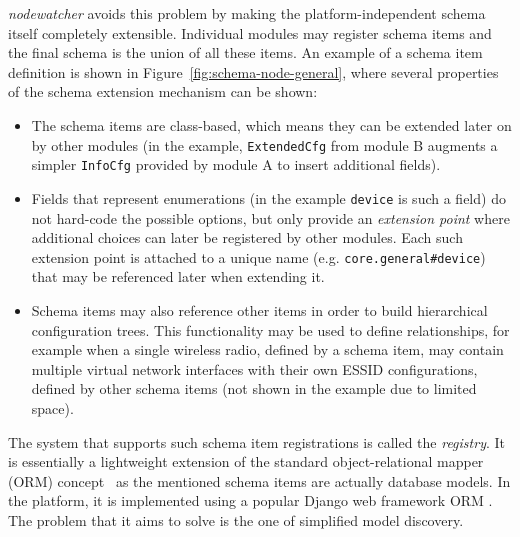 \documentclass[5p,sort&compress]{elsarticle}
\newcommand{\nodewatcher}{\textit{nodewatcher}}
\begin{document}
\nodewatcher{} avoids this problem by making the platform-independent schema itself completely extensible.
Individual modules may register schema items and the final schema is the union of all these items.
An example of a schema item definition is shown in Figure~\ref{fig:schema-node-general}, where several properties of the schema extension mechanism can be shown:
\begin{itemize}
    \item The schema items are class-based, which means they can be extended later on by other modules (in the example, \texttt{ExtendedCfg} from module B augments a simpler \texttt{InfoCfg} provided by module A to insert additional fields).
    \item Fields that represent enumerations (in the example \texttt{device} is such a field) do not hard-code the possible options, but only provide an \textit{extension point} where additional choices can later be registered by other modules.
    Each such extension point is attached to a unique name (e.g. \texttt{core.general\#device}) that may be referenced later when extending it.
    \item Schema items may also reference other items in order to build hierarchical configuration trees. This functionality may be used to define relationships, for example when a single wireless radio, defined by a schema item, may contain multiple virtual network interfaces with their own ESSID configurations, defined by other schema items (not shown in the example due to limited space).
\end{itemize}

The system that supports such schema item registrations is called the \textit{registry}.
It is essentially a lightweight extension of the standard object-relational mapper (ORM) concept~\cite{Bernstein_2007,ONeil_2008} as the mentioned schema items are actually database models.
In the platform, it is implemented using a popular Django web framework ORM \cite{django_2005}.
The problem that it aims to solve is the one of simplified model discovery.
\end{document}
